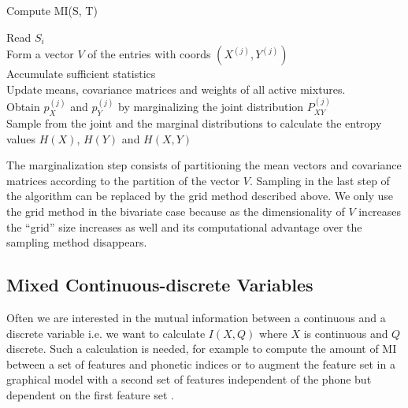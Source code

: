 \documentclass{article}
\begin{document}
\begin{algorithm}[ht]
\label{alg}
\caption{Compute MI(S, T)}
\begin{algtab}
   Read $S_i$\\
	   Form a vector $V$ of the entries with coords
$(X^{(j)},Y^{(j)})$\\  
	   Accumulate sufficient statistics\\
       \algend	
    \algend
\algend
Update means, covariance matrices and weights of all active mixtures.\\
\algend
{}
   Obtain $p_X^{(j)}$ and $p_Y^{(j)}$ by marginalizing the joint distribution $P_{XY}^{(j)}$\\
   Sample from the joint and the marginal distributions to calculate the entropy values $H(X)$, $H(Y)$ and  $H(X,Y)$\\
\algend
\end{algtab}
\end{algorithm}

The marginalization step consists of partitioning the mean vectors and
covariance matrices according to the partition of the vector $V$.
Sampling in the last step of the algorithm can be replaced by the grid
method described above.  We only use the grid method in the bivariate
case because as the dimensionality of $V$ increases the ``grid'' size
increases as well and its computational advantage over the sampling
method disappears. 

\subsection{Mixed Continuous-discrete Variables}
\label{subsec:mixed}

Often we are interested in the mutual information between a continuous
and a discrete variable i.e. we want to calculate $I(X,Q)$ where $X$
is continuous and $Q$ discrete.  Such a calculation is needed, for
example to compute the amount of MI between a set of features and
phonetic indices or to augment the feature set in a graphical model
with a second set of features independent of the phone but dependent on
the first feature set \cite{zweig2002}.
\end{document}
